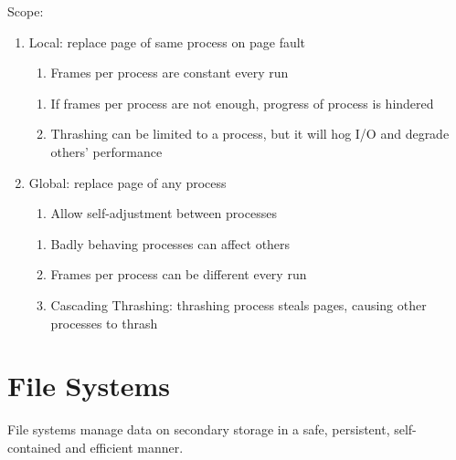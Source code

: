 \documentclass[12pt, a4paper]{article}
\begin{document}
\begin{multicols*}{3}
Scope:
\begin{enumerate}[\roman*.]
  \item Local: replace page of same process on page fault
    \vspace{3pt}
    \begin{enumerate}[$+$]
      \item Frames per process are constant every run 
    \end{enumerate}\vspace{3pt}
    \begin{enumerate}[$-$]
      \item If frames per process are not enough, progress of process is hindered
      \item Thrashing can be limited to a process, but it will hog I/O and degrade others' performance
    \end{enumerate}
  \item Global: replace page of any process
    \vspace{3pt}
    \begin{enumerate}[$+$]
      \item Allow self-adjustment between processes 
    \end{enumerate}\vspace{3pt}
    \begin{enumerate}[$-$]
      \item Badly behaving processes can affect others 
      \item Frames per process can be different every run
      \item Cascading Thrashing: thrashing process steals pages, causing other processes to thrash
    \end{enumerate}
\end{enumerate}

\colbreak
\section{File Systems}
File systems manage data on secondary storage in a safe, persistent, self-contained and efficient manner. 


\end{multicols*}
\end{document}

